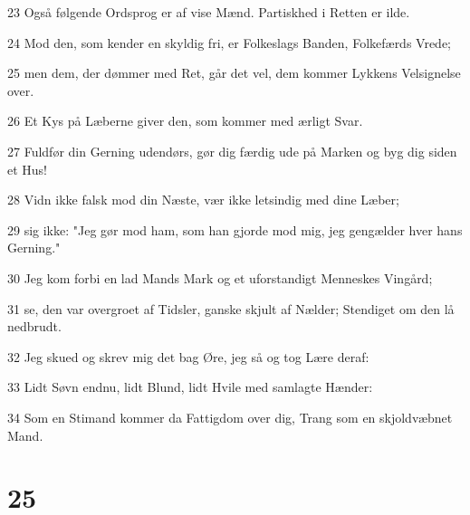 \par 23 Også følgende Ordsprog er af vise Mænd. Partiskhed i Retten er ilde.
\par 24 Mod den, som kender en skyldig fri, er Folkeslags Banden, Folkefærds Vrede;
\par 25 men dem, der dømmer med Ret, går det vel, dem kommer Lykkens Velsignelse over.
\par 26 Et Kys på Læberne giver den, som kommer med ærligt Svar.
\par 27 Fuldfør din Gerning udendørs, gør dig færdig ude på Marken og byg dig siden et Hus!
\par 28 Vidn ikke falsk mod din Næste, vær ikke letsindig med dine Læber;
\par 29 sig ikke: "Jeg gør mod ham, som han gjorde mod mig, jeg gengælder hver hans Gerning."
\par 30 Jeg kom forbi en lad Mands Mark og et uforstandigt Menneskes Vingård;
\par 31 se, den var overgroet af Tidsler, ganske skjult af Nælder; Stendiget om den lå nedbrudt.
\par 32 Jeg skued og skrev mig det bag Øre, jeg så og tog Lære deraf:
\par 33 Lidt Søvn endnu, lidt Blund, lidt Hvile med samlagte Hænder:
\par 34 Som en Stimand kommer da Fattigdom over dig, Trang som en skjoldvæbnet Mand.

\chapter{25}

